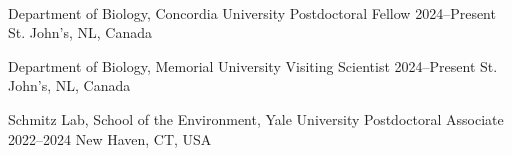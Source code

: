 \\


\begin{cventries}

\cventry
    {Department of Biology, Concordia University} %
    {Postdoctoral Fellow} %
    {2024--Present} %
    {St. John's, NL, Canada} %
    {}



\cventry
    {Department of Biology, Memorial University} %
    {Visiting Scientist} %
    {2024--Present} %
    {St. John's, NL, Canada} %
    {}


\cventry
    {Schmitz Lab, School of the Environment, Yale University} %
    {Postdoctoral Associate} %
    {2022--2024} %
    {New Haven, CT, USA} %
    {}



\end{cventries}
